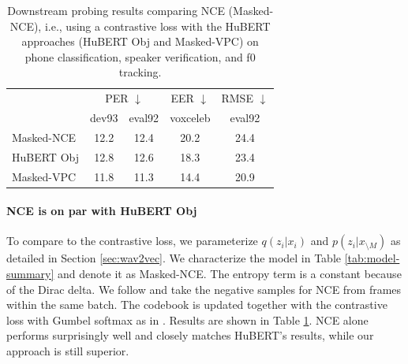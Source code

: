 \documentclass[11pt,a4paper]{article}
\begin{document}
%
%
%
%
%
%
%

\begin{table}
    \caption{Downstream probing results comparing NCE (Masked-NCE), i.e., using a contrastive loss with the HuBERT approaches (HuBERT Obj and Masked-VPC) on phone classification, speaker verification, and f0 tracking.}
    \label{tab:downstream3}
    \centering
    \footnotesize
    \begin{tabularx}{0.98\linewidth}{lcccc}
    \toprule
       &\multicolumn{2}{c}{PER $\downarrow$} &EER $\downarrow$ &RMSE $\downarrow$  \\
       &dev93 &eval92 &voxceleb &eval92  \\[1pt]
    \midrule                                                                                                                 
    Masked-NCE       &12.2          &12.4      &20.2        &24.4       \\
    HuBERT Obj           &12.8          &12.6      &18.3        &23.4       \\
    Masked-VPC       &11.8          &11.3      &14.4        &20.9       \\
    \bottomrule
    \end{tabularx}
\end{table}

\paragraph{NCE is on par with HuBERT Obj}

%
%
%
%
%

To compare to the contrastive loss, we parameterize $q(z_i|x_i)$ and $p(z_i | x_{\setminus M})$ as detailed in Section \ref{sec:wav2vec}. 
We characterize the model in Table \ref{tab:model-summary} and denote it as Masked-NCE.
The entropy term is a constant because of the Dirac delta.
%
We follow \citet{baevski2020wav2vec} and take the negative samples for NCE from frames within the same batch.
The codebook is updated together with the contrastive loss with Gumbel softmax as in \citet{baevski2020wav2vec}.
Results are shown in Table \ref{tab:downstream3}.
NCE alone performs surprisingly well and closely matches HuBERT's results, while our approach is still superior.
%

%
%
%
%
%
%
%
%


%
%
%

%
%
%
%
%
%
%
%
%
%
%

%
%
%
%
%
%
%
%

%
%
%
%
\end{document}
